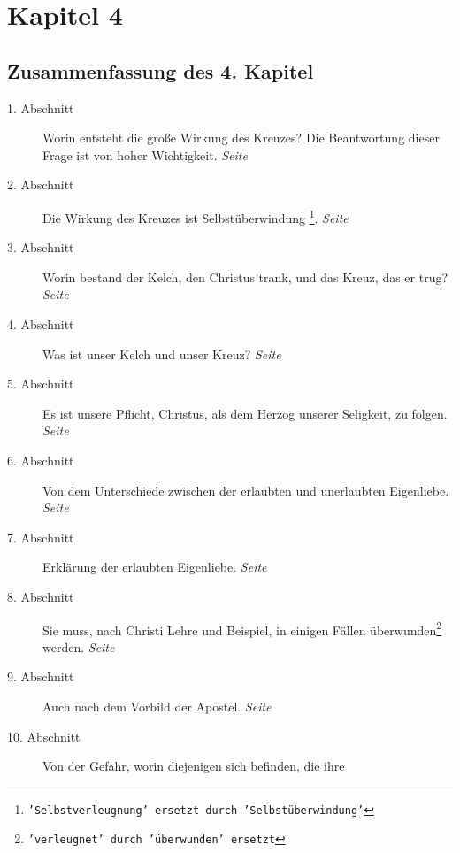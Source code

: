 

\chapter{Kapitel 4} \label{kap4}

\section{Zusammenfassung des 4. Kapitel}

\begin{description}
\item[1. Abschnitt] Worin entsteht die große Wirkung des Kreuzes? Die
Beantwortung dieser Frage ist von hoher Wichtigkeit.
\dotfill \textit{Seite~\pageref{kap4_ab1}}\\
\item[2. Abschnitt] Die Wirkung des Kreuzes ist Selbstüberwindung
\footnote{\texttt{'Selbstverleugnung' ersetzt durch 'Selbstüberwindung'}}.
\dotfill \textit{Seite~\pageref{kap4_ab2}}\\
\item[3. Abschnitt] Worin bestand der Kelch, den Christus trank, und das Kreuz,
das er trug?
\dotfill \textit{Seite~\pageref{kap4_ab3}}\\
\item[4. Abschnitt]  Was ist unser Kelch und unser Kreuz?
\dotfill \textit{Seite~\pageref{kap4_ab4}}\\
\item[5. Abschnitt] Es ist unsere Pflicht, Christus, als dem Herzog unserer
Seligkeit, zu folgen.
\dotfill \textit{Seite~\pageref{kap4_ab5}}\\
\item[6. Abschnitt] Von dem Unterschiede zwischen der erlaubten und unerlaubten
Eigenliebe.
\dotfill \textit{Seite~\pageref{kap4_ab6}}\\
\item[7. Abschnitt] Erklärung der erlaubten Eigenliebe.
\dotfill \textit{Seite~\pageref{kap4_ab7}}\\
\item[8. Abschnitt] Sie muss, nach Christi Lehre und Beispiel, in einigen Fällen
überwunden\footnote{\texttt{'verleugnet' durch 'überwunden' ersetzt}} werden.
\dotfill \textit{Seite~\pageref{kap4_ab8}}\\
\item[9. Abschnitt] Auch nach dem Vorbild der Apostel.
\dotfill \textit{Seite~\pageref{kap4_ab9}}\\
\item[10. Abschnitt] Von der Gefahr, worin diejenigen sich befinden, die ihre

\end{description}
